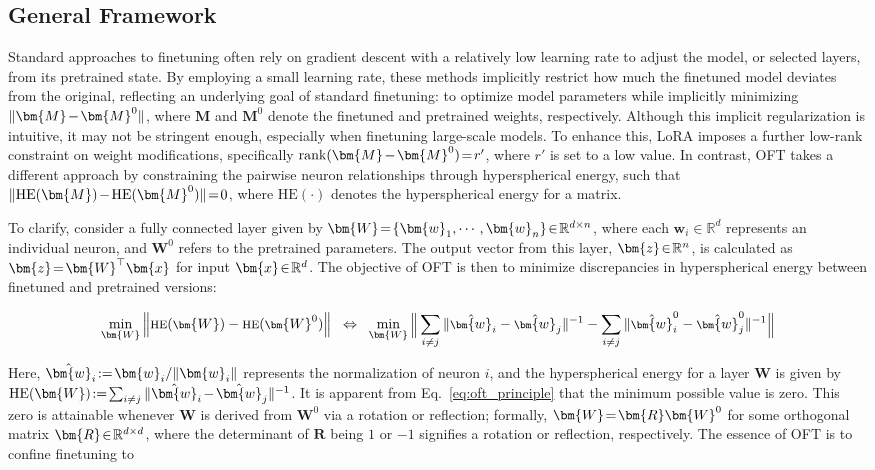 \subsection{General Framework}

Standard approaches to finetuning often rely on gradient descent with a relatively low learning rate to adjust the model, or selected layers, from its pretrained state. By employing a small learning rate, these methods implicitly restrict how much the finetuned model deviates from the original, reflecting an underlying goal of standard finetuning: to optimize model parameters while implicitly minimizing $\thickmuskip=2mu \medmuskip=2mu \| \bm{M} - \bm{M}^0\|$, where $\bm{M}$ and $\bm{M}^0$ denote the finetuned and pretrained weights, respectively. Although this implicit regularization is intuitive, it may not be stringent enough, especially when finetuning large-scale models. To enhance this, LoRA imposes a further low-rank constraint on weight modifications, specifically $\thickmuskip=2mu \medmuskip=2mu \text{rank}(\bm{M} - \bm{M}^0)=r'$, where $r'$ is set to a low value. In contrast, OFT takes a different approach by constraining the pairwise neuron relationships through hyperspherical energy, such that $\thickmuskip=2mu \medmuskip=2mu \| \text{HE}(\bm{M})-\text{HE}(\bm{M}^0) \|=0$, where $\text{HE}(\cdot)$ denotes the hyperspherical energy for a matrix. 

To clarify, consider a fully connected layer given by $\thickmuskip=2mu \medmuskip=2mu \bm{W}=\{\bm{w}_1,\cdots,\bm{w}_n\}\in\mathbb{R}^{d\times n}$, where each $\bm{w}_i\in\mathbb{R}^{d}$ represents an individual neuron, and $\bm{W}^0$ refers to the pretrained parameters. The output vector from this layer, $\thickmuskip=2mu \medmuskip=2mu \bm{z}\in\mathbb{R}^n$, is calculated as $\thickmuskip=2mu \medmuskip=2mu \bm{z}=\bm{W}^\top\bm{x}$ for input $\thickmuskip=2mu \medmuskip=2mu \bm{x}\in\mathbb{R}^d$. The objective of OFT is then to minimize discrepancies in hyperspherical energy between finetuned and pretrained versions:

\begin{equation}\label{eq:oft_principle}
\footnotesize
\min_{\bm{W}} \left\| \text{HE}(\bm{W})-\text{HE}(\bm{W}^0)\right\|~~\Leftrightarrow~~\min_{\bm{W}} \bigg{\|} \sum_{i\neq j} \|\hat{\bm{w}}_i-\hat{\bm{w}}_j\|^{-1}-\sum_{i\neq j} \|\hat{\bm{w}}^0_i-\hat{\bm{w}}^0_j\|^{-1}\bigg{\|}
\end{equation}

Here, $\thickmuskip=2mu \medmuskip=2mu \hat{\bm{w}}_i:=\bm{w}_i/\|\bm{w}_i\|$ represents the normalization of neuron $i$, and the hyperspherical energy for a layer $\bm{W}$ is given by $\thickmuskip=2mu \medmuskip=2mu \text{HE}(\bm{W}):= \sum_{i\neq j} \|\hat{\bm{w}}_i-\hat{\bm{w}}_j\|^{-1}$. It is apparent from Eq.~\eqref{eq:oft_principle} that the minimum possible value is zero. This zero is attainable whenever $\bm{W}$ is derived from $\bm{W}^0$ via a rotation or reflection; formally, $\thickmuskip=2mu \medmuskip=2mu \bm{W}=\bm{R}\bm{W}^0$ for some orthogonal matrix $\thickmuskip=2mu \medmuskip=2mu \bm{R}\in\mathbb{R}^{d\times d}$, where the determinant of $\bm{R}$ being $1$ or $-1$ signifies a rotation or reflection, respectively. The essence of OFT is to confine finetuning to

